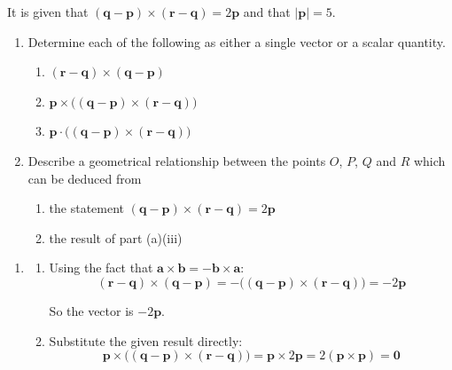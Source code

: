 \documentclass[leqno]{article}
\begin{document}
\begin{enumerate}[
  label=\textbf{\arabic*.},
  leftmargin=*,
  topsep=0pt,
  partopsep=0pt,
  parsep=0pt
]
It is given that $(\mathbf{q}-\mathbf{p}) \times (\mathbf{r}-\mathbf{q}) = 2\mathbf{p}$ and that $\lvert \mathbf{p} \rvert = 5$. \\

\begin{enumerate}[label=\textbf{(\alph*)}]
  \item Determine each of the following as either a single vector or a scalar quantity.
  \begin{enumerate}[label=(\roman*)]
    \item $(\mathbf{r}-\mathbf{q}) \times (\mathbf{q}-\mathbf{p})$ 
    \item $\mathbf{p} \times \big((\mathbf{q}-\mathbf{p}) \times (\mathbf{r}-\mathbf{q})\big)$ 
    \item $\mathbf{p} \cdot \big((\mathbf{q}-\mathbf{p}) \times (\mathbf{r}-\mathbf{q})\big)$  \\
  \end{enumerate}
  \item Describe a geometrical relationship between the points $O$, $P$, $Q$ and $R$ which can be deduced from
  \begin{enumerate}[label=(\roman*)]
    \item the statement $(\mathbf{q}-\mathbf{p}) \times (\mathbf{r}-\mathbf{q}) = 2\mathbf{p}$ 
    \item the result of part (a)(iii)  \\
  \end{enumerate}
\end{enumerate}

\vspace*{10pt}

\begin{djsSolution}
\begin{enumerate}[label=\textbf{(\alph*)}]
  \item
  \begin{enumerate}[label=(\roman*)]
    \item Using the fact that $\mathbf a\times\mathbf b=-\mathbf b\times\mathbf a$:
    \[
    (\mathbf r-\mathbf q)\times(\mathbf q-\mathbf p)
    =-\big((\mathbf q-\mathbf p)\times(\mathbf r-\mathbf q)\big)
    =-2\mathbf p
    \]

    So the vector is $-2\mathbf p$.

    \item Substitute the given result directly:
    \[
    \mathbf p\times\big((\mathbf q-\mathbf p)\times(\mathbf r-\mathbf q)\big)
    =\mathbf p\times 2\mathbf p
    =2(\mathbf p\times\mathbf p)
    =\mathbf 0
    \]


\end{enumerate}
\end{enumerate}
\end{djsSolution}
\end{enumerate}
\end{document}
